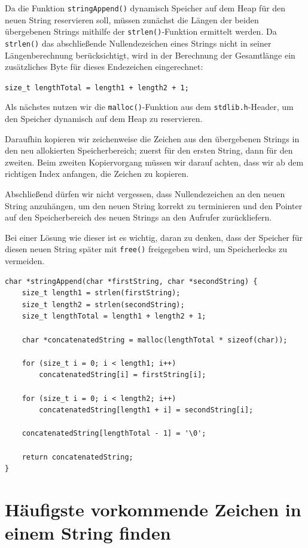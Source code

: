 Da die Funktion \texttt{stringAppend()} dynamisch Speicher auf dem Heap
für den neuen String reservieren soll, müssen zunächst die Längen der beiden
übergebenen Strings mithilfe der \texttt{strlen()}-Funktion ermittelt
werden. Da \texttt{strlen()} das abschließende Nullendezeichen eines
Strings nicht in seiner Längenberechnung berücksichtigt, wird in der Berechnung
der Gesamtlänge ein zusätzliches Byte für dieses Endezeichen eingerechnet:

\texttt{size_t lengthTotal = length1 + length2 + 1;}

Als nächstes nutzen wir die \texttt{malloc()}-Funktion aus dem
\texttt{stdlib.h}-Header, um den Speicher dynamisch auf dem Heap zu
reservieren.

Daraufhin kopieren wir zeichenweise die Zeichen aus den übergebenen Strings in
den neu allokierten Speicherbereich; zuerst für den ersten String, dann für den
zweiten. Beim zweiten Kopiervorgang müssen wir darauf achten, dass wir ab dem
richtigen Index anfangen, die Zeichen zu kopieren.

Abschließend dürfen wir nicht vergessen, dass Nullendezeichen an den neuen
String anzuhängen, um den neuen String korrekt zu terminieren und den Pointer
auf den Speicherbereich des neuen Strings an den Aufrufer zurückliefern.

Bei einer Lösung wie dieser ist es wichtig, daran zu denken, dass der Speicher
für diesen neuen String später mit \texttt{free()} freigegeben wird, um
Speicherlecks zu vermeiden.

\begin{verbatim}
char *stringAppend(char *firstString, char *secondString) {
    size_t length1 = strlen(firstString);
    size_t length2 = strlen(secondString);
    size_t lengthTotal = length1 + length2 + 1;

    char *concatenatedString = malloc(lengthTotal * sizeof(char));

    for (size_t i = 0; i < length1; i++)
        concatenatedString[i] = firstString[i];

    for (size_t i = 0; i < length2; i++)
        concatenatedString[length1 + i] = secondString[i];

    concatenatedString[lengthTotal - 1] = '\0';

    return concatenatedString;
}
\end{verbatim}





\chapter{Häufigste vorkommende Zeichen in einem String finden}

